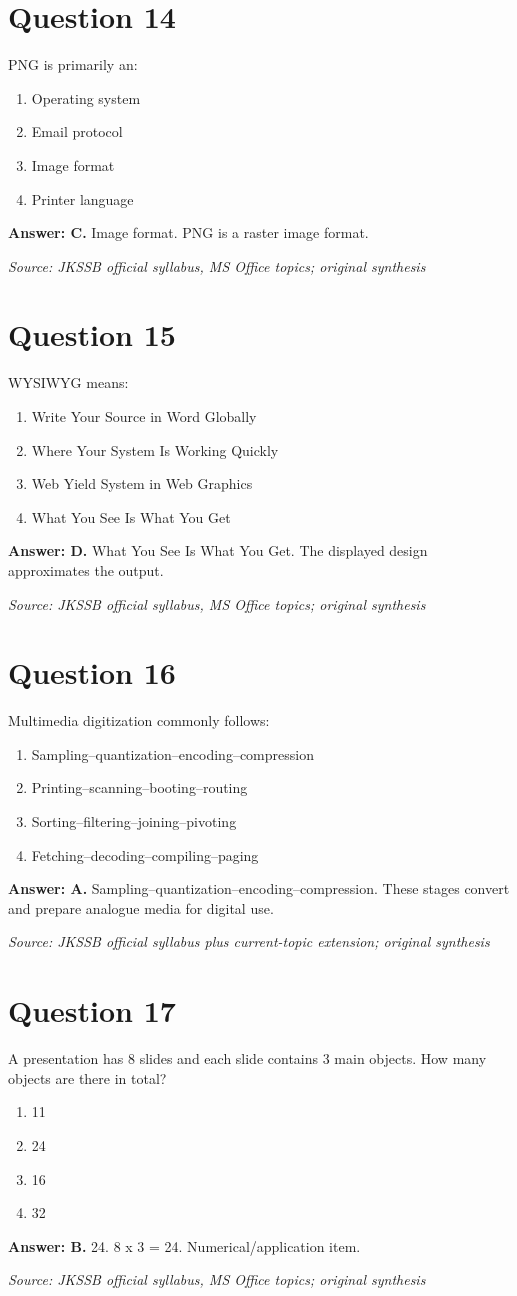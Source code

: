 \documentclass[11pt,a4paper]{book}
\newcommand{\source}[1]{\par\smallskip\textit{Source: #1}}
\newcommand{\answer}[2]{\par\textbf{Answer: #1.} #2}
\begin{document}
\section*{Question 14}
PNG is primarily an:
\begin{enumerate}[label=\Alph*.]
\item Operating system
\item Email protocol
\item Image format
\item Printer language
\end{enumerate}
\answer{C}{Image format. PNG is a raster image format.}
\source{JKSSB official syllabus, MS Office topics; original synthesis}
\section*{Question 15}
WYSIWYG means:
\begin{enumerate}[label=\Alph*.]
\item Write Your Source in Word Globally
\item Where Your System Is Working Quickly
\item Web Yield System in Web Graphics
\item What You See Is What You Get
\end{enumerate}
\answer{D}{What You See Is What You Get. The displayed design approximates the output.}
\source{JKSSB official syllabus, MS Office topics; original synthesis}
\section*{Question 16}
Multimedia digitization commonly follows:
\begin{enumerate}[label=\Alph*.]
\item Sampling–quantization–encoding–compression
\item Printing–scanning–booting–routing
\item Sorting–filtering–joining–pivoting
\item Fetching–decoding–compiling–paging
\end{enumerate}
\answer{A}{Sampling–quantization–encoding–compression. These stages convert and prepare analogue media for digital use.}
\source{JKSSB official syllabus plus current-topic extension; original synthesis}
\section*{Question 17}
A presentation has 8 slides and each slide contains 3 main objects. How many objects are there in total?
\begin{enumerate}[label=\Alph*.]
\item 11
\item 24
\item 16
\item 32
\end{enumerate}
\answer{B}{24. 8 x 3 = 24. Numerical/application item.}
\source{JKSSB official syllabus, MS Office topics; original synthesis}
\end{document}
